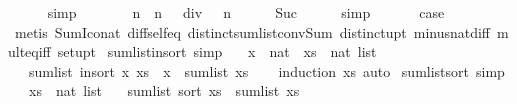 \begin{isabellebody}
\ \ \ \ \isamarkupfalse%
\ simp\isanewline
\ \ \isamarkupfalse%
\ \isamarkupfalse%
\ {\isachardoublequoteopen}{\isachardot}{\isachardot}{\isachardot}\ {\isacharequal}\ n\ {\isacharasterisk}\ {\isacharparenleft}n\ {\isacharminus}\ {}{\isacharparenright}\ div\ {}\ {\isacharplus}\ n{\isachardoublequoteclose}\isanewline
\ \ \ \ \isamarkupfalse%
\ Suc\isanewline
\ \ \ \ \isamarkupfalse%
\ simp\isanewline
\ \ \isamarkupfalse%
\isanewline
\ \ \isamarkupfalse%
\ {\isacharquery}case\isanewline
\ \ \ \ \isamarkupfalse%
\ {\isacharparenleft}metis\ Sum{\isacharunderscore}Ico{\isacharunderscore}nat\ diff{\isacharunderscore}self{\isacharunderscore}eq{\isacharunderscore}{}\ distinct{\isacharunderscore}sum{\isacharunderscore}list{\isacharunderscore}conv{\isacharunderscore}Sum\ distinct{\isacharunderscore}upt\ minus{\isacharunderscore}nat{\isachardot}diff{\isacharunderscore}{}\ mult{\isacharunderscore}eq{\isacharunderscore}{}{\isacharunderscore}iff\ set{\isacharunderscore}upt{\isacharparenright}\isanewline
{}\isamarkupfalse%
%
\endisatagproof
{\isafoldproof}%
%
\isadelimproof
\isanewline
%
\endisadelimproof
\isanewline
{}\isamarkupfalse%
\ sum{\isacharunderscore}list{\isacharunderscore}insort\ {\isacharbrackleft}simp{\isacharbrackright}{\isacharcolon}\isanewline
\ \ \ x\ {\isacharcolon}{\isacharcolon}\ nat\ \ xs\ {\isacharcolon}{\isacharcolon}\ {\isachardoublequoteopen}nat\ list{\isachardoublequoteclose}\isanewline
\ \ \ {\isachardoublequoteopen}sum{\isacharunderscore}list\ {\isacharparenleft}insort\ x\ xs{\isacharparenright}\ {\isacharequal}\ x\ {\isacharplus}\ sum{\isacharunderscore}list\ xs{\isachardoublequoteclose}\isanewline
%
\isadelimproof
\ \ %
\endisadelimproof
%
\isatagproof
{}\isamarkupfalse%
\ {\isacharparenleft}induction\ xs{\isacharcomma}\ auto{\isacharparenright}%
\endisatagproof
{\isafoldproof}%
%
\isadelimproof
\isanewline
%
\endisadelimproof
\isanewline
{}\isamarkupfalse%
\ sum{\isacharunderscore}list{\isacharunderscore}sort\ {\isacharbrackleft}simp{\isacharbrackright}{\isacharcolon}\isanewline
\ \ \ xs\ {\isacharcolon}{\isacharcolon}\ {\isachardoublequoteopen}nat\ list{\isachardoublequoteclose}\isanewline
\ \ \ {\isachardoublequoteopen}sum{\isacharunderscore}list\ {\isacharparenleft}sort\ xs{\isacharparenright}\ {\isacharequal}\ sum{\isacharunderscore}list\ xs{\isachardoublequoteclose}\isanewline

\end{isabellebody}
